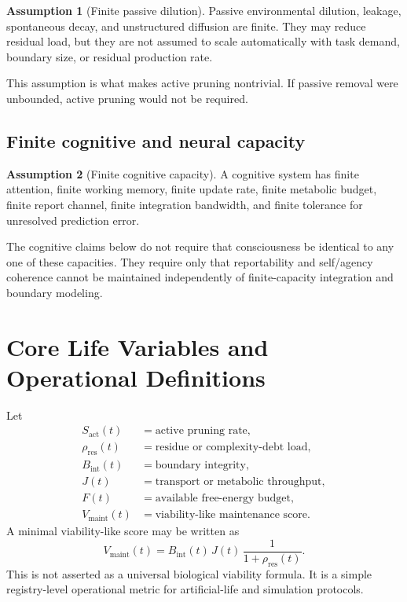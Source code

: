 \documentclass[10pt,a4paper,twocolumn,aps,prl]{revtex4-2}
\theoremstyle{claimstyle}
\theoremstyle{definition}
\newtheorem*{assumption}{Assumption}
\newcommand{\Sactive}{S_{\mathrm{act}}}
\newcommand{\rhodebt}{\rho_{\mathrm{res}}}
\newcommand{\Bint}{B_{\mathrm{int}}}
\newcommand{\Jflow}{J}
\newcommand{\Vlife}{V_{\mathrm{maint}}}
\begin{document}
\begin{assumption}[Finite passive dilution]
Passive environmental dilution, leakage, spontaneous decay, and unstructured diffusion are finite. They may reduce residual load, but they are not assumed to scale automatically with task demand, boundary size, or residual production rate.
\end{assumption}

This assumption is what makes active pruning nontrivial. If passive removal were unbounded, active pruning would not be required.

\subsection{Finite cognitive and neural capacity}

\begin{assumption}[Finite cognitive capacity]
A cognitive system has finite attention, finite working memory, finite update rate, finite metabolic budget, finite report channel, finite integration bandwidth, and finite tolerance for unresolved prediction error.
\end{assumption}

The cognitive claims below do not require that consciousness be identical to any one of these capacities. They require only that reportability and self/agency coherence cannot be maintained independently of finite-capacity integration and boundary modeling.

\section{Core Life Variables and Operational Definitions}

Let
\begin{align}
    \Sactive(t) &= \text{active pruning rate},\\
    \rhodebt(t) &= \text{residue or complexity-debt load},\\
    \Bint(t) &= \text{boundary integrity},\\
    \Jflow(t) &= \text{transport or metabolic throughput},\\
    F(t) &= \text{available free-energy budget},\\
    \Vlife(t) &= \text{viability-like maintenance score}.
\end{align}
A minimal viability-like score may be written as
\begin{equation}
\Vlife(t)=\Bint(t)\,\Jflow(t)\,\frac{1}{1+\rhodebt(t)}.
\end{equation}
This is not asserted as a universal biological viability formula. It is a simple registry-level operational metric for artificial-life and simulation protocols.
\end{document}
